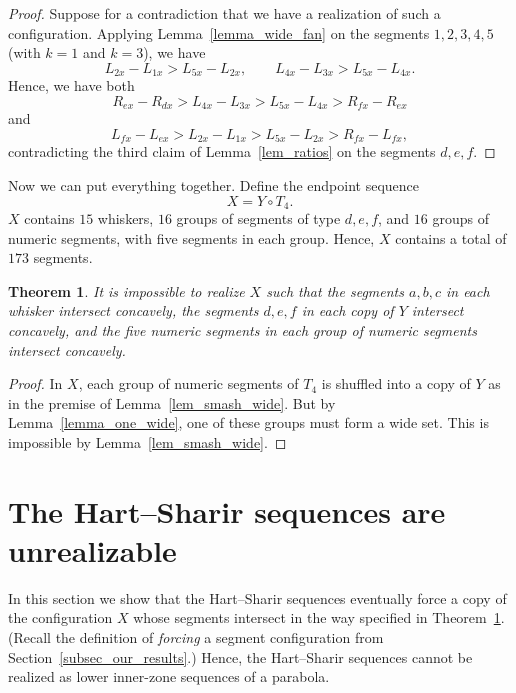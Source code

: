 \documentclass[11pt]{article}
\newtheorem{theorem}{Theorem}[section]
\theoremstyle{definition}
\theoremstyle{remark}
\begin{document}
\begin{proof}
Suppose for a contradiction that we have a realization of such a configuration. Applying Lemma~\ref{lemma_wide_fan} on the segments $1,2,3,4,5$ (with $k=1$ and $k=3$), we have
\begin{equation*}
L_{2x} - L_{1x} > L_{5x} - L_{2x}, \qquad L_{4x} - L_{3x} > L_{5x} - L_{4x}.
\end{equation*}
Hence, we have both
\begin{equation*}
R_{ex}-R_{dx} > L_{4x} - L_{3x} > L_{5x} - L_{4x} > R_{fx} - R_{ex}
\end{equation*}
and
\begin{equation*}
L_{fx} - L_{ex} > L_{2x} - L_{1x} > L_{5x} - L_{2x} > R_{fx} - L_{fx},
\end{equation*}
contradicting the third claim of Lemma~\ref{lem_ratios} on the segments $d,e,f$.
\end{proof}

Now we can put everything together. Define the endpoint sequence
\begin{equation*}
X = Y \circ T_4.
\end{equation*}
$X$ contains $15$ whiskers, $16$ groups of segments of type $d,e,f$, and $16$ groups of numeric segments, with five segments in each group. Hence, $X$ contains a total of $173$ segments.

\begin{theorem}\label{thm_forbidden_2}
It is impossible to realize $X$ such that the segments $a,b,c$ in each whisker intersect concavely,  the segments $d,e,f$ in each copy of $Y$ intersect concavely, and the five numeric segments in each group of numeric segments intersect concavely.
\end{theorem}

\begin{proof}
In $X$, each group of numeric segments of $T_4$ is shuffled into a copy of $Y$ as in the premise of Lemma~\ref{lem_smash_wide}. But by Lemma~\ref{lemma_one_wide}, one of these groups must form a wide set. This is impossible by Lemma~\ref{lem_smash_wide}.
\end{proof}

\section{The Hart--Sharir sequences are unrealizable}\label{sec_ababa}

In this section we show that the Hart--Sharir sequences eventually force a copy of the configuration $X$ whose segments intersect in the way specified in Theorem~\ref{thm_forbidden_2}. (Recall the definition of \emph{forcing} a segment configuration from Section~\ref{subsec_our_results}.) Hence, the Hart--Sharir sequences cannot be realized as lower inner-zone sequences of a parabola.
\end{document}
